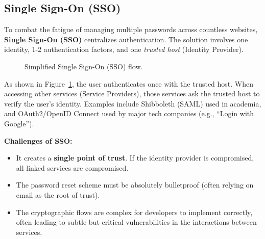 \subsection{Single Sign-On (SSO)}
To combat the fatigue of managing multiple passwords across countless websites, \textbf{Single Sign-On (SSO)} centralizes authentication. The solution involves one identity, 1-2 authentication factors, and one \textit{trusted host} (Identity Provider).

\begin{figure}[h!]
    \centering
    \caption{Simplified Single Sign-On (SSO) flow.}
    \label{fig:sso_flow}
\end{figure}

As shown in Figure~\ref{fig:sso_flow}, the user authenticates once with the trusted host. When accessing other services (Service Providers), those services ask the trusted host to verify the user's identity. Examples include Shibboleth (SAML) used in academia, and OAuth2/OpenID Connect used by major tech companies (e.g., ``Login with Google'').

\textbf{Challenges of SSO:}
\begin{itemize}
    \item It creates a \textbf{single point of trust}. If the identity provider is compromised, all linked services are compromised.
    \item The password reset scheme must be absolutely bulletproof (often relying on email as the root of trust).
    \item The cryptographic flows are complex for developers to implement correctly, often leading to subtle but critical vulnerabilities in the interactions between services.
\end{itemize}

